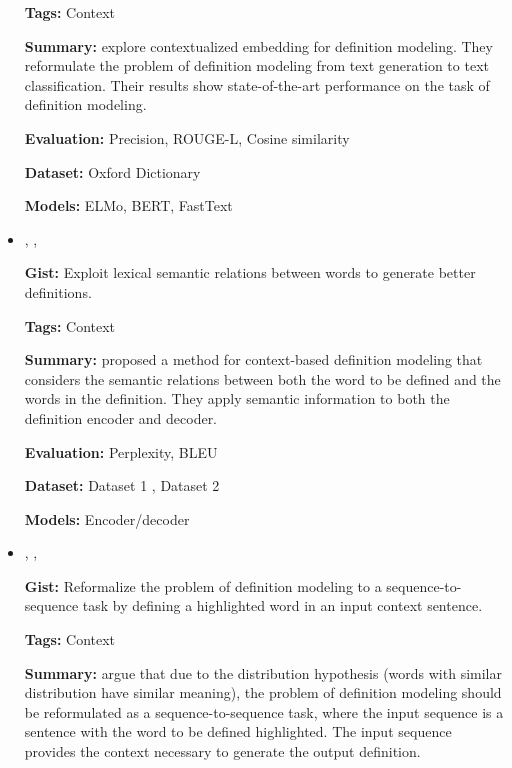 \documentclass{article}[a4paper]
\newcommand{\bitem}[2]{
    \item[\cite{#1}]
        \citetitle{#1}, \citeauthor{#1}, \citeyear{#1}
        \newline
        {#2}
}%
\begin{document}
\begin{itemize}
{        \textbf{Tags:}
        Context

        \textbf{Summary:}
        \citeauthor{chang_what_2019} explore contextualized embedding for
        definition modeling. They reformulate the problem of definition modeling
        from text generation to text classification. Their results show
        state-of-the-art performance on the task of definition modeling.

        \textbf{Evaluation:}
        Precision, ROUGE-L, Cosine similarity

        \textbf{Dataset:}
        Oxford Dictionary

        \textbf{Models:}
        ELMo, BERT, FastText
    }%

    \bitem{washio_bridging_2019}%
    {%
        \textbf{Gist:}
        Exploit lexical semantic relations between words to generate better
        definitions.

        \textbf{Tags:}
        Context

        \textbf{Summary:}
        \citeauthor{washio_bridging_2019} proposed a method for context-based
        definition modeling that considers the semantic relations between both
        the word to be defined and the words in the definition. They apply
        semantic information to both the definition encoder and decoder.

        \textbf{Evaluation:}
        Perplexity, BLEU

        \textbf{Dataset:}
        Dataset 1 \cite{noraset_definition_2016},
        Dataset 2 \cite{gadetsky_conditional_2018}

        \textbf{Models:}
        Encoder/decoder
    }%

    \bitem{mickus_mark_2019}%
    {%
        \textbf{Gist:}
        Reformalize the problem of definition modeling to a sequence-to-sequence
        task by defining a highlighted word in an input context sentence.

        \textbf{Tags:}
        Context

        \textbf{Summary:}
        \citeauthor{mickus_mark_2019} argue that due to the distribution
        hypothesis (words with similar distribution have similar meaning), the
        problem of definition modeling should be reformulated as a
        sequence-to-sequence task, where the input sequence is a sentence with
        the word to be defined highlighted. The input sequence provides the
        context necessary to generate the output definition.

}
\end{itemize}
\end{document}

